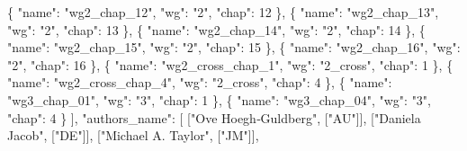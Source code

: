 \documentclass[
]{article}
\newenvironment{Shaded}{}{}
\newcommand{\DataTypeTok}[1]{\textcolor[rgb]{0.56,0.13,0.00}{#1}}
\newcommand{\DecValTok}[1]{\textcolor[rgb]{0.25,0.63,0.44}{#1}}
\newcommand{\FunctionTok}[1]{\textcolor[rgb]{0.02,0.16,0.49}{#1}}
\newcommand{\OtherTok}[1]{\textcolor[rgb]{0.00,0.44,0.13}{#1}}
\newcommand{\StringTok}[1]{\textcolor[rgb]{0.25,0.44,0.63}{#1}}
\begin{document}
\begin{Shaded}
\begin{Highlighting}[]
    \FunctionTok{\{} \DataTypeTok{"name"}\FunctionTok{:} \StringTok{"wg2\_chap\_12"}\FunctionTok{,} \DataTypeTok{"wg"}\FunctionTok{:} \StringTok{"2"}\FunctionTok{,} \DataTypeTok{"chap"}\FunctionTok{:} \DecValTok{12} \FunctionTok{\}}\OtherTok{,}
    \FunctionTok{\{} \DataTypeTok{"name"}\FunctionTok{:} \StringTok{"wg2\_chap\_13"}\FunctionTok{,} \DataTypeTok{"wg"}\FunctionTok{:} \StringTok{"2"}\FunctionTok{,} \DataTypeTok{"chap"}\FunctionTok{:} \DecValTok{13} \FunctionTok{\}}\OtherTok{,}
    \FunctionTok{\{} \DataTypeTok{"name"}\FunctionTok{:} \StringTok{"wg2\_chap\_14"}\FunctionTok{,} \DataTypeTok{"wg"}\FunctionTok{:} \StringTok{"2"}\FunctionTok{,} \DataTypeTok{"chap"}\FunctionTok{:} \DecValTok{14} \FunctionTok{\}}\OtherTok{,}
    \FunctionTok{\{} \DataTypeTok{"name"}\FunctionTok{:} \StringTok{"wg2\_chap\_15"}\FunctionTok{,} \DataTypeTok{"wg"}\FunctionTok{:} \StringTok{"2"}\FunctionTok{,} \DataTypeTok{"chap"}\FunctionTok{:} \DecValTok{15} \FunctionTok{\}}\OtherTok{,}
    \FunctionTok{\{} \DataTypeTok{"name"}\FunctionTok{:} \StringTok{"wg2\_chap\_16"}\FunctionTok{,} \DataTypeTok{"wg"}\FunctionTok{:} \StringTok{"2"}\FunctionTok{,} \DataTypeTok{"chap"}\FunctionTok{:} \DecValTok{16} \FunctionTok{\}}\OtherTok{,}
    \FunctionTok{\{} \DataTypeTok{"name"}\FunctionTok{:} \StringTok{"wg2\_cross\_chap\_1"}\FunctionTok{,} \DataTypeTok{"wg"}\FunctionTok{:} \StringTok{"2\_cross"}\FunctionTok{,} \DataTypeTok{"chap"}\FunctionTok{:} \DecValTok{1} \FunctionTok{\}}\OtherTok{,}
    \FunctionTok{\{} \DataTypeTok{"name"}\FunctionTok{:} \StringTok{"wg2\_cross\_chap\_4"}\FunctionTok{,} \DataTypeTok{"wg"}\FunctionTok{:} \StringTok{"2\_cross"}\FunctionTok{,} \DataTypeTok{"chap"}\FunctionTok{:} \DecValTok{4} \FunctionTok{\}}\OtherTok{,}
    \FunctionTok{\{} \DataTypeTok{"name"}\FunctionTok{:} \StringTok{"wg3\_chap\_01"}\FunctionTok{,} \DataTypeTok{"wg"}\FunctionTok{:} \StringTok{"3"}\FunctionTok{,} \DataTypeTok{"chap"}\FunctionTok{:} \DecValTok{1} \FunctionTok{\}}\OtherTok{,}
    \FunctionTok{\{} \DataTypeTok{"name"}\FunctionTok{:} \StringTok{"wg3\_chap\_04"}\FunctionTok{,} \DataTypeTok{"wg"}\FunctionTok{:} \StringTok{"3"}\FunctionTok{,} \DataTypeTok{"chap"}\FunctionTok{:} \DecValTok{4} \FunctionTok{\}}
  \OtherTok{]}\FunctionTok{,}
  \DataTypeTok{"authors\_name"}\FunctionTok{:} \OtherTok{[}
    \OtherTok{[}\StringTok{"Ove Hoegh‐Guldberg"}\OtherTok{,} \OtherTok{[}\StringTok{"AU"}\OtherTok{]],}
    \OtherTok{[}\StringTok{"Daniela Jacob"}\OtherTok{,} \OtherTok{[}\StringTok{"DE"}\OtherTok{]],}
    \OtherTok{[}\StringTok{"Michael A. Taylor"}\OtherTok{,} \OtherTok{[}\StringTok{"JM"}\OtherTok{]],}

\end{Highlighting}
\end{Shaded}
\end{document}
